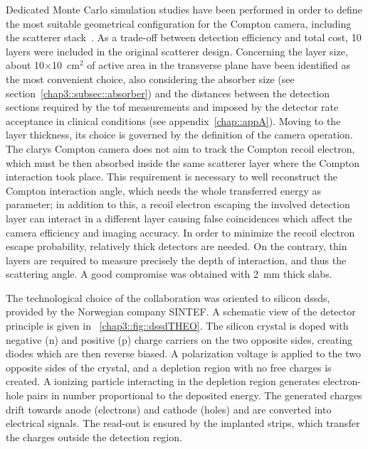 Dedicated Monte Carlo simulation studies have been performed in order to define the most suitable geometrical configuration for the Compton camera, including the scatterer stack~\parencite{Richard2012}. As a trade-off between detection efficiency and total cost, 10 layers were included in the original scatterer design. Concerning the layer size, about 10$\times$10~cm$^{2}$ of active area in the transverse plane have been identified as the most convenient choice, also considering the absorber size (see section~\ref{chap3::subsec::absorber}) and the distances between the detection sections required by the \gls{tof} measurements and imposed by the detector rate acceptance in clinical conditions (see appendix~\ref{chap::appA}). Moving to the layer thickness, its choice is governed by the definition of the camera operation. The \gls{clarys} Compton camera does not aim to track the Compton recoil electron, which must be then absorbed inside the same scatterer layer where the Compton interaction took place. This requirement is necessary to well reconstruct the Compton interaction angle, which needs the whole transferred energy as parameter; in addition to this, a recoil electron escaping the involved detection layer can interact in a different layer causing false coincidences which affect the camera efficiency and imaging accuracy. In order to minimize the recoil electron escape probability, relatively thick detectors are needed. On the contrary, thin layers are required to measure precisely the depth of interaction, and thus the scattering angle. A good compromise was obtained with 2~mm thick slabs.

The technological choice of the collaboration was oriented to silicon \glspl{dssd}, provided by the Norwegian company SINTEF. A schematic view of the detector principle is given in \figurename~\ref{chap3::fig::dssdTHEO}. The silicon crystal is doped with negative (n) and positive (p) charge carriers on the two opposite sides, creating diodes which are then reverse biased. A polarization voltage is applied to the two opposite sides of the crystal, and a depletion region with no free charges is created. A ionizing particle interacting in the depletion region generates electron-hole pairs in number proportional to the deposited energy. The generated charges drift towards anode (electrons) and cathode (holes) and are converted into electrical signals. The read-out is ensured by the implanted strips, which transfer the charges outside the detection region.     

